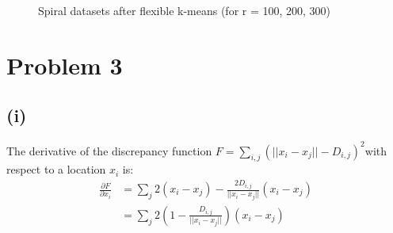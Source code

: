 \documentclass[]{homework}
\begin{document}
\begin{figure}[!htbp]
\centering
{}%
\label{figure3k}
%
\label{figure3k}
%
\label{figure3k}
\caption{Spiral datasets after flexible k-means (for r = 100, 200, 300)}
\end{figure}
\newpage 
\section*{Problem 3}
\subsection*{(i)}
The derivative of the discrepancy function $F = \sum_{i, j} (||x_i - x_j||-D_{i,j})^2$with respect to a location $x_i$ is:
%
\begin{equation}
\begin{split}
\frac{\partial F}{\partial x_i} &= \sum_{j} 2(x_i - x_j) - \frac{2D_{i,j}}{||x_i - x_j||}(x_i - x_j) \\
&=\sum_{j} 2(1-\frac{D_{i,j}}{||x_i - x_j||})(x_i - x_j) 
\end{split}
\label{E31}
\end{equation}
 
\end{document}
